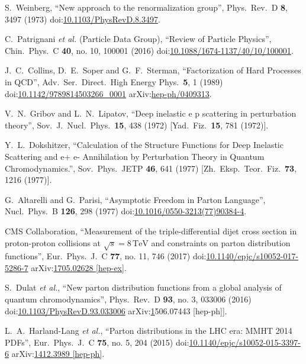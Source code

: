 \begin{thebibliography}{99}
S.~Weinberg, ``New approach to the renormalization group'', Phys.\ Rev.\ D {\bf 8}, 3497 (1973) doi:\href{http://dx.doi.org/10.1103/PhysRevD.8.3497}{10.1103/PhysRevD.8.3497}.

C.~Patrignani {\it et al.} (Particle Data Group), ``Review of Particle Physics'', Chin.\ Phys.\ C {\bf 40}, no. 10, 100001 (2016) doi:\href{http://dx.doi.org/10.1088/1674-1137/40/10/100001}{10.1088/1674-1137/40/10/100001}.

J.~C.~Collins, D.~E.~Soper and G.~F.~Sterman, ``Factorization of Hard Processes in QCD'', Adv.\ Ser.\ Direct.\ High Energy Phys.\ {\bf 5}, 1 (1989) doi:\href{http://dx.doi.org/10.1142/9789814503266\_0001}{10.1142/9789814503266\_0001} arXiv:\href{https://arxiv.org/abs/hep-ph/0409313}{hep-ph/0409313}.

V.~N.~Gribov and L.~N.~Lipatov, ``Deep inelastic e p scattering in perturbation theory'', Sov.\ J.\ Nucl.\ Phys.\ {\bf 15}, 438 (1972) [Yad.\ Fiz.\ {\bf 15}, 781 (1972)].

Y.~L.~Dokshitzer, ``Calculation of the Structure Functions for Deep Inelastic Scattering and e+ e- Annihilation by Perturbation Theory in Quantum Chromodynamics.'', Sov.\ Phys.\ JETP {\bf 46}, 641 (1977) [Zh.\ Eksp.\ Teor.\ Fiz.\ {\bf 73}, 1216 (1977)].

G.~Altarelli and G.~Parisi, ``Asymptotic Freedom in Parton Language'', Nucl.\ Phys.\ B {\bf 126}, 298 (1977) doi:\href{http://dx.doi.org/10.1016/0550-3213(77)90384-4}{10.1016/0550-3213(77)90384-4}.

CMS Collaboration, ``Measurement of the triple-differential dijet cross section in proton-proton collisions at $\sqrt{s}=8\,\text {TeV} $ and constraints on parton distribution functions'', Eur.\ Phys.\ J.\ C {\bf 77}, no. 11, 746 (2017) doi:\href{http://dx.doi.org/10.1140/epjc/s10052-017-5286-7}{10.1140/epjc/s10052-017-5286-7} arXiv:\href{https://arxiv.org/abs/1705.02628}{1705.02628 [hep-ex]}.

S.~Dulat {\it et al.}, ``New parton distribution functions from a global analysis of quantum chromodynamics'', Phys.\ Rev.\ D {\bf 93}, no. 3, 033006 (2016) doi:\href{http://dx.doi.org/10.1103/PhysRevD.93.033006}{10.1103/PhysRevD.93.033006} arXiv:\href{https://arxiv.org/abs/1506.07443}1506.07443 [hep-ph]].

L.~A.~Harland-Lang {\it et al.}, ``Parton distributions in the LHC era: MMHT 2014 PDFs'', Eur.\ Phys.\ J.\ C {\bf 75}, no. 5, 204 (2015) doi:\href{http://dx.doi.org/10.1140/epjc/s10052-015-3397-6}{10.1140/epjc/s10052-015-3397-6} arXiv:\href{https://arxiv.org/abs/1412.3989}{1412.3989 [hep-ph]}.


\end{thebibliography}
